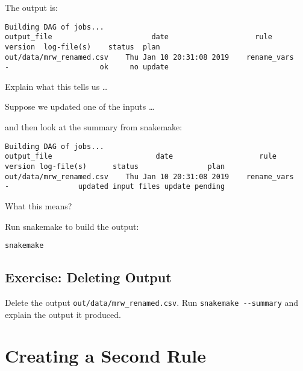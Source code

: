 \documentclass[]{book}
\newenvironment{Shaded}{\begin{snugshade}}{\end{snugshade}}
\newcommand{\KeywordTok}[1]{\textcolor[rgb]{0.13,0.29,0.53}{\textbf{{#1}}}}
\newcommand{\NormalTok}[1]{{#1}}
\theoremstyle{definition}
\theoremstyle{definition}
\theoremstyle{definition}
\theoremstyle{remark}
\begin{document}
The output is:

\begin{verbatim}
Building DAG of jobs...
output_file                       date                    rule      version  log-file(s)    status  plan
out/data/mrw_renamed.csv    Thu Jan 10 20:31:08 2019    rename_vars    -                     ok     no update
\end{verbatim}

Explain what this tells us \ldots{}

Suppose we updated one of the inputs \ldots{}

\begin{Shaded}
\end{Shaded}

and then look at the summary from snakemake:

\begin{Shaded}
\end{Shaded}

\begin{verbatim}
Building DAG of jobs...
output_file                        date                    rule     version log-file(s)      status                plan
out/data/mrw_renamed.csv    Thu Jan 10 20:31:08 2019    rename_vars    -                updated input files update pending
\end{verbatim}

What this means?

Run snakemake to build the output:

\begin{verbatim}
snakemake
\end{verbatim}

\subsection*{Exercise: Deleting Output}\label{exercise-deleting-output}

Delete the output \texttt{out/data/mrw\_renamed.csv}. Run
\texttt{snakemake\ -\/-summary} and explain the output it produced.

\section{Creating a Second Rule}\label{creating-a-second-rule}
\end{document}
